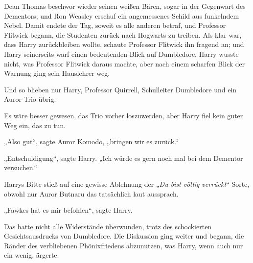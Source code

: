 Dean Thomas beschwor wieder seinen weißen Bären, sogar in der Gegenwart des Dementors; und Ron Weasley erschuf ein angemessenes Schild aus funkelndem Nebel. Damit endete der Tag, soweit es alle anderen betraf, und Professor Flitwick begann, die Studenten zurück nach Hogwarts zu treiben. Als klar war, dass Harry zurückbleiben wollte, schaute Professor Flitwick ihn fragend an; und Harry seinerseits warf einen bedeutenden Blick auf Dumbledore. Harry wusste nicht, was Professor Flitwick daraus machte, aber nach einem scharfen Blick der Warnung ging sein Hauslehrer weg.

Und so blieben nur Harry, Professor Quirrell, Schulleiter Dumbledore und ein Auror-Trio übrig.

Es wäre besser gewesen, das Trio vorher loszuwerden, aber Harry fiel kein guter Weg ein, das zu tun.

„Also gut“, sagte Auror Komodo, „bringen wir es zurück.“

„Entschuldigung“, sagte Harry. „Ich würde es gern noch mal bei dem Dementor versuchen.“

\later

Harrys Bitte stieß auf eine gewisse Ablehnung der „\emph{Du bist völlig verrückt}“-Sorte, obwohl nur Auror Butnaru das tatsächlich laut aussprach.

„Fawkes hat es mir befohlen“, sagte Harry.

Das hatte nicht alle Widerstände überwunden, trotz des schockierten Gesichtsausdrucks von Dumbledore. Die Diskussion ging weiter und begann, die Ränder des verbliebenen Phönixfriedens abzunutzen, was Harry, wenn auch nur ein wenig, ärgerte.

